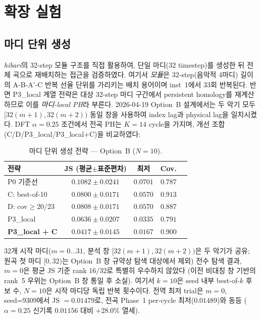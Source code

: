 \documentclass[11pt,a4paper]{article}
\begin{document}
\section{확장 실험}
\label{sec:extensions}

\subsection{마디 단위 생성}
\label{subsec:module}

\emph{hibari}의 32-step 모듈 구조를 직접 활용하여,
단일 마디(32 timestep)를 생성한 뒤 전체 곡으로 재배치하는 접근을 검증하였다.
여기서 \emph{모듈}은 32-step(음악적 4마디) 길이의 A-B-A'-C 반복 선율 단위를
가리키는 배치 용어이며 inst~1에서 33회 반복된다. 반면
P3\_local 계열 전략은 대상 32-step 마디 구간에서 persistent homology를
재계산하므로 이를 \emph{마디-local PH}라 부른다.
2026-04-19 Option~B 설계에서는 두 악기 모두 $[32(m+1),32(m+2))$ 동일 창을
사용하여 index lag과 physical lag을 일치시켰다. DFT $\alpha=0.25$ 조건에서
전곡 PH는 $K=14$ cycle을 가지며, 개선 조합(C/D/P3\_local/P3\_local+C)을
비교하였다:

\begin{table}[H]
\centering
\caption{마디 단위 생성 전략 — Option~B ($N=10$).}
\label{tab:module}
\begin{tabular}{lcccc}
\toprule
전략 & JS (평균$\pm$표준편차) & 최저 & Cov. \\
\midrule
P0 기준선          & $0.1082 \pm 0.0241$ & $0.0701$ & $0.787$ \\
C: best-of-10      & $0.0800 \pm 0.0171$ & $0.0570$ & $0.913$ \\
D: cov$\ge$20/23   & $0.0808 \pm 0.0171$ & $0.0570$ & $0.887$ \\
P3\_local          & $0.0636 \pm 0.0207$ & $0.0335$ & $0.791$ \\
\textbf{P3\_local + C} & $\mathbf{0.0417 \pm 0.0145}$ & $\mathbf{0.0167}$ & $0.900$ \\
\bottomrule
\end{tabular}
\end{table}

32개 시작 마디($m = 0\ldots31$, 분석 창 $[32(m+1),32(m+2))$은 두 악기가 공유;
원곡 첫 마디 $[0,32)$는 Option~B 창 규약상 탐색 대상에서 제외) 전수 탐색 결과,
$m=0$은 평균 JS 기준 rank $16/32$로 특별히 우수하지 않았다
(이전 비대칭 창 기반의 rank~5 우위는 Option~B 창 통일 후 소실).
여기서 $k=10$은 seed 내부 best-of-$k$ 후보 수, $N=10$은 시작 마디당
독립 반복 횟수이다. 전역 최저 trial은
$m=0$, seed=9309에서 JS $=0.01479$로,
전곡 Phase~1 per-cycle 최저($0.01489$)와 동등 ($\alpha=0.25$ 신기록 $0.01156$ 대비 $+28.0\%$ 열세).
\end{document}
